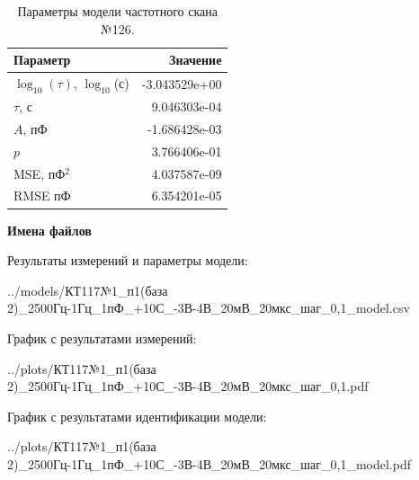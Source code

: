 \begin{table}[!ht]
    \centering
    \caption{Параметры модели частотного скана №126.}
    \begin{tabular}{|l|r|}
        \hline
        Параметр                                       & Значение                  \\ \hline
        $\log_{10}(\tau)$, $\log_{10}$(с)              & -3.043529e+00             \\ \hline
        $\tau$, с                                      & 9.046303e-04              \\ \hline
        $A$, пФ                                        & -1.686428e-03             \\ \hline
        $p$                                            & 3.766406e-01              \\ \hline
        MSE, пФ$^2$                                    & 4.037587e-09              \\ \hline
        RMSE пФ                                        & 6.354201e-05              \\ \hline
    \end{tabular}
    \label{table:frequency_scan_model_126}
\end{table}

\textbf{Имена файлов}

Результаты измерений и параметры модели:

\scriptsize../models/КТ117№1\_п1(база 2)\_2500Гц-1Гц\_1пФ\_+10С\_-3В-4В\_20мВ\_20мкс\_шаг\_0,1\_model.csv
\normalsize

График с результатами измерений:

\scriptsize../plots/КТ117№1\_п1(база 2)\_2500Гц-1Гц\_1пФ\_+10С\_-3В-4В\_20мВ\_20мкс\_шаг\_0,1.pdf
\normalsize

График с результатами идентификации модели:

\scriptsize../plots/КТ117№1\_п1(база 2)\_2500Гц-1Гц\_1пФ\_+10С\_-3В-4В\_20мВ\_20мкс\_шаг\_0,1\_model.pdf
\normalsize


